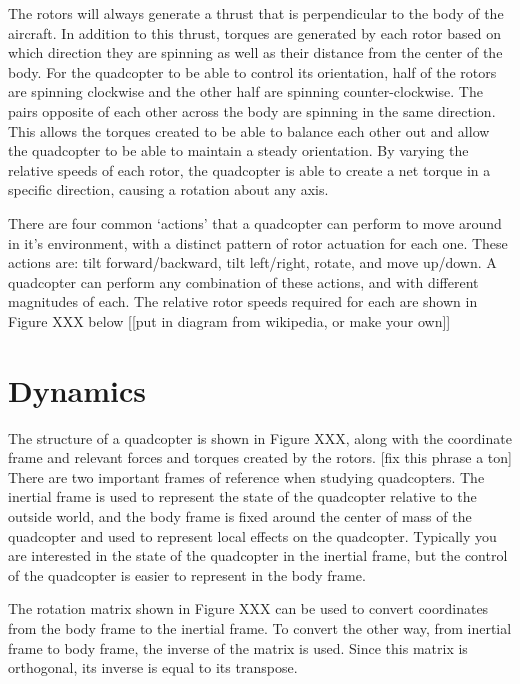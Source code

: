 \documentclass[letterpaper,12pt,titlepage,oneside,final]{book}
\begin{document}
The rotors will always generate a thrust that is perpendicular to the body of the aircraft. 
In addition to this thrust, torques are generated by each rotor based on which direction they are spinning as well as their distance from the center of the body.
For the quadcopter to be able to control its orientation, half of the rotors are spinning clockwise and the other half are spinning counter-clockwise. 
The pairs opposite of each other across the body are spinning in the same direction. This allows the torques created to be able to balance each other out and allow the quadcopter to be able to maintain a steady orientation. 
By varying the relative speeds of each rotor, the quadcopter is able to create a net torque in a specific direction, causing a rotation about any axis.

There are four common ‘actions’ that a quadcopter can perform to move around in it’s environment, with a distinct pattern of rotor actuation for each one. 
These actions are: tilt forward/backward, tilt left/right, rotate, and move up/down. 
A quadcopter can perform any combination of these actions, and with different magnitudes of each. The relative rotor speeds required for each are shown in Figure XXX below [[put in diagram from wikipedia, or make your own]]

\section{Dynamics}


The structure of a quadcopter is shown in Figure XXX, along with the coordinate frame and relevant forces and torques created by the rotors.
[fix this phrase a ton] There are two important frames of reference when studying quadcopters. The inertial frame is used to represent the state of the quadcopter relative to the outside world, and the body frame is fixed around the center of mass of the quadcopter and used to represent local effects on the quadcopter.
Typically you are interested in the state of the quadcopter in the inertial frame, but the control of the quadcopter is easier to represent in the body frame. 


The rotation matrix shown in Figure XXX can be used to convert coordinates from the body frame to the inertial frame. 
To convert the other way, from inertial frame to body frame, the inverse of the matrix is used. 
Since this matrix is orthogonal, its inverse is equal to its transpose.
\end{document}
